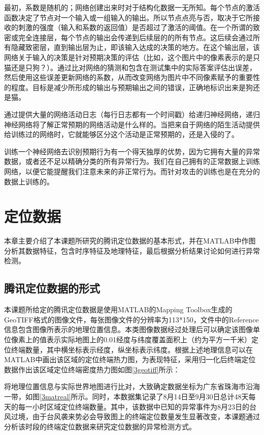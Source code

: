 \documentclass[a4paper,AutoFakeBold,oneside,12pt]{book}
\begin{document}
	最初，系数是随机的；网络创建出来时对于结构化数据一无所知。每个节点的激活函数决定了节点对一个输入或一组输入的输出。所以节点点亮与否，取决于它所接收的刺激的强度（输入和系数的返回值）是否超过了激活的阈值。在一个所谓的致密或完全连接层，每个节点的输出会传递到后续层的的所有节点。这后续会通过所有隐藏致密层，直到输出层为止，即该输入达成的决策的地方。在这个输出层，该网络关于输入的决策是针对预期决策的评估（比如，这个图片中的像素表示的是只猫还是只狗？）。通过比对网络的猜测和包含在测试集中的实际答案评估出误差，然后使用这些误差更新网络的系数，从而改变网络为图片中不同像素赋予的重要性的程度。目标是减少所形成的输出与预期输出之间的错误，正确地标识出来是狗还是猫。

	通过提供大量的网络活动日志（每行日志都有一个时间戳）给递归神经网络，递归神经网络将了解正常预期的网络活动是什么样的。当把来自于网络的陌生活动提供给训练过的网络时，它就能够区分这个活动是正常预期的，还是入侵的了。

	训练一个神经网络去识别预期行为有一个得天独厚的优势，因为它拥有大量的异常数据，或者还不足以精确分类的所有异常行为。我们在自己拥有的正常数据上训练网络，以便它能提醒我们注意未来的非正常行为。而针对攻击的训练也是在充分的数据上训练的。


\chapter{定位数据}
	本章主要介绍了本课题所研究的腾讯定位数据的基本形式，并在MATLAB中作图分析其数据特征，包含时序特征及地理特征，最后根据分析结果讨论如何进行异常检测。


\section{腾讯定位数据的形式}
	本课题所给定的腾讯定位数据是使用MATLAB的Mapping Toolbox生成的GeoTIFF格式的图像文件，每张图像文件的分辨率为113*150，文件中的Reference信息包含图像所表示的地理位置信息。本类图像数据经过处理后可以确定该图像单位像素上的值表示实际地图上的0.01经度与纬度覆盖面积上（约为平方一千米）定位终端数量，其中横坐标表示经度，纵坐标表示纬度。根据上述地理信息可以在MATLAB中画出该区域的定位终端热力图，为表现特征，采用归一化后终端定位数据作出该区域定位终端密度热力图如图\ref{3geotiff}所示：

	将地理位置信息与实际世界地图进行比对，大致确定数据坐标为广东省珠海市沿海一带，如图\ref{3matreal}所示。同时，本数据集记录了8月14日至9月30日总计48天每天的每一小时区域定位终端数量。其中，该数据中已知的异常事件为8月23日的台风过境，由于台风袭来势必会导致图上的终端定位数量发生显著改变，本课题通过分析该时段的终端定位数据来研究定位数据的异常检测方式。
\end{document}
